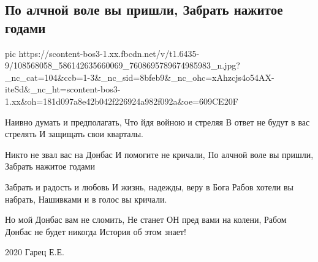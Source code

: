 
 
 
 
 
\subsection{По алчной воле вы пришли, Забрать нажитое годами}
\label{sec:11_07_2020.fb.lnrgumo.1.vojna_donbass_stih}

\ifcmt
  pic https://scontent-bos3-1.xx.fbcdn.net/v/t1.6435-9/108568058_586142635660069_7608695789674985983_n.jpg?_nc_cat=104&ccb=1-3&_nc_sid=8bfeb9&_nc_ohc=xAhzcjs4o54AX-iteSd&_nc_ht=scontent-bos3-1.xx&oh=181d097a8e42b042f226924a982f092a&oe=609CE20F
\fi

Наивно думать и предполагать, 
Что йдя войною и стреляя 
В ответ не будут в вас стрелять 
И защищать свои кварталы. 

Никто не звал вас на Донбас 
И помогите не кричали, 
По алчной воле вы пришли, 
Забрать нажитое годами 

Забрать и радость и любовь 
И жизнь, надежды, веру в Бога 
Рабов хотели вы набрать, 
Нашивками и в голос вы кричали. 

Но мой Донбас вам не сломить, 
Не станет ОН пред вами на колени, 
Рабом Донбас не будет никогда 
История об этом знает! 

2020 Гарец Е.Е.
